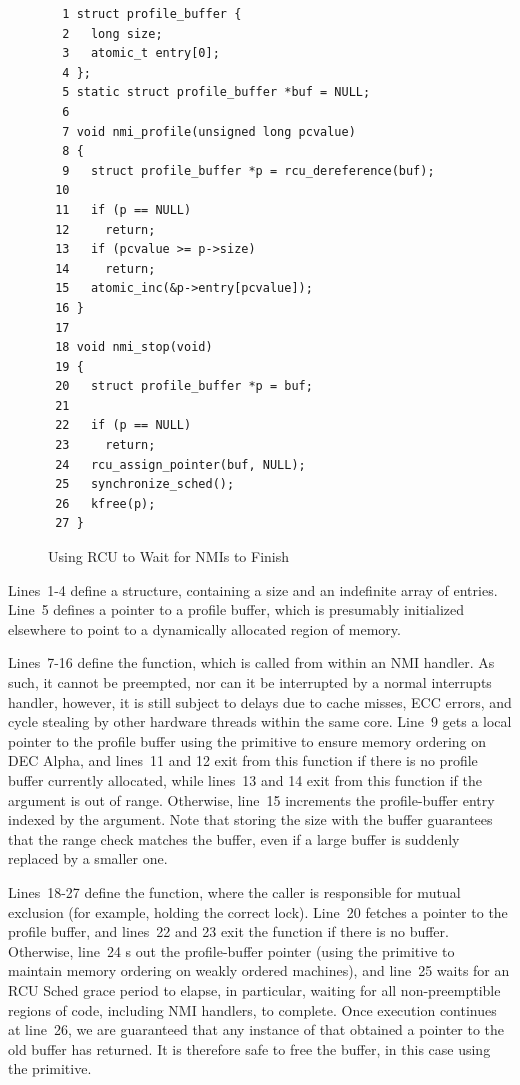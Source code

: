 \begin{figure}[tbp]
{ \scriptsize
\begin{verbatim}
  1 struct profile_buffer {
  2   long size;
  3   atomic_t entry[0];
  4 };
  5 static struct profile_buffer *buf = NULL;
  6
  7 void nmi_profile(unsigned long pcvalue)
  8 {
  9   struct profile_buffer *p = rcu_dereference(buf);
 10
 11   if (p == NULL)
 12     return;
 13   if (pcvalue >= p->size)
 14     return;
 15   atomic_inc(&p->entry[pcvalue]);
 16 }
 17
 18 void nmi_stop(void)
 19 {
 20   struct profile_buffer *p = buf;
 21
 22   if (p == NULL)
 23     return;
 24   rcu_assign_pointer(buf, NULL);
 25   synchronize_sched();
 26   kfree(p);
 27 }
\end{verbatim}
}
\caption{Using RCU to Wait for NMIs to Finish}
\label{fig:defer:Using RCU to Wait for NMIs to Finish}
\end{figure}

Lines~1-4 define a  structure, containing a
size and an indefinite array of entries.
Line~5 defines a pointer to a profile buffer, which is
presumably initialized elsewhere to point to a dynamically allocated
region of memory.

Lines~7-16 define the  function,
which is called from within an NMI handler.
As such, it cannot be preempted, nor can it be interrupted by a normal
interrupts handler, however, it is still subject to delays due to cache misses,
ECC errors, and cycle stealing by other hardware threads within the same
core.
Line~9 gets a local pointer to the profile buffer using the
 primitive to ensure memory ordering on
DEC Alpha, and
lines~11 and 12 exit from this function if there is no
profile buffer currently allocated, while lines~13 and 14
exit from this function if the  argument
is out of range.
Otherwise, line~15 increments the profile-buffer entry indexed
by the  argument.
Note that storing the size with the buffer guarantees that the
range check matches the buffer, even if a large buffer is suddenly
replaced by a smaller one.

Lines~18-27 define the  function,
where the caller is responsible for mutual exclusion (for example,
holding the correct lock).
Line~20 fetches a pointer to the profile buffer, and
lines~22 and 23 exit the function if there is no buffer.
Otherwise, line~24 s out the profile-buffer pointer
(using the  primitive to maintain
memory ordering on weakly ordered machines),
and line~25 waits for an RCU Sched grace period to elapse,
in particular, waiting for all non-preemptible regions of code,
including NMI handlers, to complete.
Once execution continues at line~26, we are guaranteed that
any instance of  that obtained a
pointer to the old buffer has returned.
It is therefore safe to free the buffer, in this case using the
 primitive.

